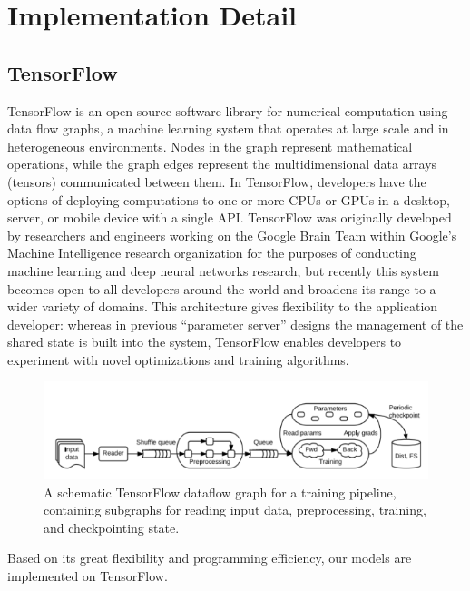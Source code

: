 \documentclass[12pt]{report} %
\begin{document}
\section{Implementation Detail}
\subsection{TensorFlow}
TensorFlow\cite{TF, TF2} is an open source software library for numerical computation using data flow graphs, a machine learning system that operates at large scale and in heterogeneous environments. Nodes in the graph represent mathematical operations, while the graph edges represent the multidimensional data arrays (tensors) communicated between them. In TensorFlow, developers have the options of deploying computations to one or more CPUs or GPUs in a desktop, server, or mobile device with a single API. TensorFlow was originally developed by researchers and engineers working on the Google Brain Team within Google's Machine Intelligence research organization for the purposes of conducting machine learning and deep neural networks research, but recently this system becomes open to all developers around the world and broadens its range to a wider variety of domains. This architecture gives flexibility to the application developer: whereas in previous “parameter server” designs the management of the shared state is built into the system, TensorFlow enables developers to experiment with novel optimizations and training algorithms. \\
\begin{figure}[H]
	\centering
	\includegraphics[scale=1.0]{pictures/tensorflow.png}
	\caption{A schematic TensorFlow dataflow graph for a training pipeline, containing subgraphs for reading input data, preprocessing, training, and checkpointing state\cite{TFPIC}.}
	\label{fig:3}
\end{figure}
Based on its great flexibility and programming efficiency, our models are implemented on TensorFlow. 
\end{document}
